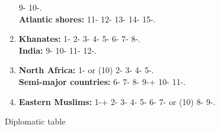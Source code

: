 \begin{tablehere}
\begin{enumerate}
    9- %
    10-.\\ %
    {\bf Atlantic shores:} %
    11- %
    12- %
    13- %
    14- %
    15-. %
  \item {\bf Khanates:} %
    1- %
    2- %
    3- %
    4- %
    5- %
    6- %
    7- %
    8-.\\ %
    {\bf India:} %
    9- %
    10- %
    11- %
    12-. %
  \item {\bf North Africa:} %
    1- or (10) %
    2- %
    3- %
    4-%
    5-.\\ %
    {\bf Semi-major countries:} %
    6- %
    7- %
    8- %
    9-+ %
    10- %
    11-. %
  \item {\bf Eastern Muslims:} %
    1-+ %
    2- %
    3- %
    4- %
    5- %
    6- %
    7- or (10) %
    8- %
    9-. %
  \end{enumerate}
  \caption{Diplomatic table}\label{table:diplomatic event}
\end{tablehere}

\clearpage



